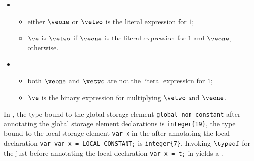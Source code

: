 \ProseParagraph
\OneApplies
\begin{itemize}
  \item {}
  \begin{itemize}
    \item either $\veone$ or $\vetwo$ is the literal expression for $1$;
    \item $\ve$ is $\vetwo$ if $\veone$ is the literal expression for $1$ and $\veone$, otherwise.
  \end{itemize}

  \item {}
  \begin{itemize}
    \item both $\veone$ and $\vetwo$ are not the literal expression for $1$;
    \item $\ve$ is the binary expression for multiplying $\vetwo$ and $\veone$.
  \end{itemize}
\end{itemize}

\FormallyParagraph
\begin{mathpar}
\end{mathpar}

\begin{mathpar}
\end{mathpar}


In , the type bound to the global storage element
\verb|global_non_constant| after annotating the global storage element declarations
is \verb|integer{19}|,
%
the type bound to the local storage element \verb|var_x| in the \staticenvironmentterm{}
after annotating the local declaration \verb|var var_x = LOCAL_CONSTANT;| is \verb|integer{7}|.
%
Invoking $\typeof$ for the \staticenvironmentterm{} just before annotating the local
declaration \verb|var x = t;| in  yields a \typingerrorterm.

